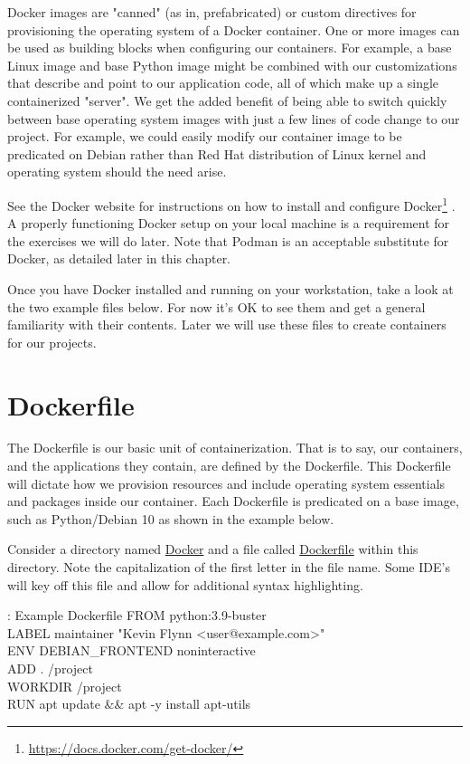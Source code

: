 \justify
Docker images are "canned" (as in, prefabricated) or custom directives
for provisioning the operating system of a Docker container. One or more
images can be used as building blocks when configuring our containers.
For example, a base Linux image and base Python image might be combined
with our customizations that describe and point to our application code,
all of which make up a single containerized "server". We get the added
benefit of being able to switch quickly between base operating system
images with just a few lines of code change to our project. For example,
we could easily modify our container image to be predicated on Debian
rather than Red Hat distribution of Linux kernel and operating system
should the need arise.

\justify
See the Docker website for instructions on how to install and configure
Docker\footnote{\url{https://docs.docker.com/get-docker/}} . A properly
functioning Docker setup on your local machine is a requirement for the
exercises we will do later. Note that Podman is an acceptable substitute
for Docker, as detailed later in this chapter.

\justify
Once you have Docker installed and running on your workstation, take a look at the two example files below. For now it's OK to see them and get a general familiarity with their contents. Later we will use these files
to create containers for our projects.

\section{Dockerfile}
\justify
The Dockerfile is our basic unit of containerization. That is to say,
our containers, and the applications they contain, are defined by the
Dockerfile. This Dockerfile will dictate how we provision resources and
include operating system essentials and packages inside our container.
Each Dockerfile is predicated on a base image, such as Python/Debian 10
as shown in the example below.

\justify
Consider a directory named
\href{https://github.com/hotpeppersec/rapid_secdev_framework/tree/master/docker}{Docker}
and a file called
\href{https://github.com/hotpeppersec/rapid_secdev_framework/blob/master/docker/Dockerfile}{Dockerfile}
within this directory. Note the capitalization of the first letter in the file name. Some IDE's will key off this file and allow for additional syntax highlighting.

\begin{mybox}{\thetcbcounter: Example Dockerfile}
FROM python:3.9-buster\\
LABEL maintainer "Kevin Flynn <user@example.com>"\\

ENV DEBIAN\_FRONTEND noninteractive\\

ADD . /project\\
WORKDIR /project\\

RUN apt update \&\& apt -y install apt-utils\\
\end{mybox}

